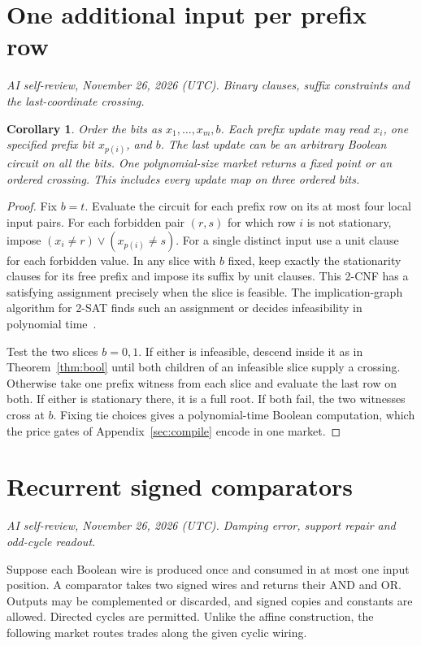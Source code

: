 \documentclass[11pt,oneside,openany,notitlepage]{report}
\newtheorem{corollary}[theorem]{Corollary}
\newcommand{\reviewdate}{November 26, 2026 (UTC)}
\newcommand{\reviewmark}[1]{\par\nopagebreak[4]\noindent
  {\footnotesize\itshape AI self-review, \reviewdate. #1\par}\nobreak\smallskip}
\begin{document}
\section{One additional input per prefix row}
\reviewmark{Binary clauses, suffix constraints and the last-coordinate crossing.}
\begin{corollary}\label{cor:binary-prefix}
Order the bits as \(x_1,\ldots,x_m,b\). Each prefix update may read
\(x_i\), one specified prefix bit \(x_{p(i)}\), and \(b\). The last
update can be an arbitrary Boolean circuit on all the bits. One
polynomial-size market returns a fixed point or an ordered crossing.
This includes every update map on three ordered bits.
\end{corollary}
\begin{proof}
Fix \(b=t\). Evaluate the circuit for each prefix row on its at most four
local input pairs. For each forbidden pair \((r,s)\) for which row \(i\)
is not stationary, impose
\((x_i\ne r)\lor(x_{p(i)}\ne s)\). For a single distinct input use a
unit clause for each forbidden value. In any slice with \(b\) fixed,
keep exactly the stationarity clauses for its free prefix and impose
its suffix by unit clauses. This 2-CNF has a satisfying assignment
precisely when the slice is feasible. The implication-graph algorithm
for 2-SAT finds such an assignment or decides infeasibility in polynomial
time~\cite{apt}.

Test the two slices \(b=0,1\). If either is infeasible, descend inside
it as in Theorem~\ref{thm:bool} until both children of an infeasible
slice supply a crossing. Otherwise take one prefix witness from each
slice and evaluate the last row on both. If either is stationary there,
it is a full root. If both fail, the two witnesses cross at \(b\).
Fixing tie choices gives a polynomial-time Boolean computation, which
the price gates of Appendix~\ref{sec:compile} encode in one market.
\end{proof}

\section{Recurrent signed comparators}
\reviewmark{Damping error, support repair and odd-cycle readout.}

Suppose each Boolean wire is produced once and consumed in at most one
input position. A comparator takes two signed wires and returns their
AND and OR. Outputs may be complemented or discarded, and signed copies
and constants are allowed. Directed cycles are permitted. Unlike the
affine construction, the following market routes trades along the given
cyclic wiring.
\end{document}
